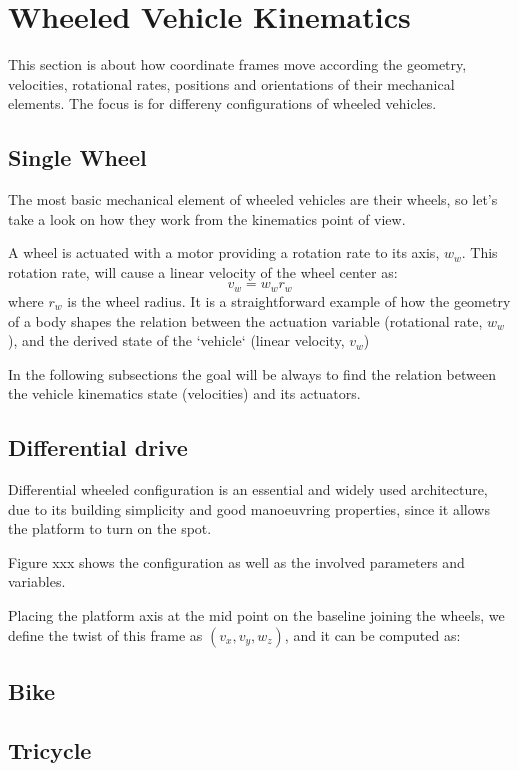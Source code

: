 \section{Wheeled Vehicle Kinematics}
This section is about how coordinate frames move according the geometry, velocities, rotational rates, positions and orientations of their mechanical elements. The focus is for differeny configurations of wheeled vehicles. 

\subsection{Single Wheel}
The most basic mechanical element of wheeled vehicles are their wheels, so let's take a look on how they work from the kinematics point of view.

A wheel is actuated with a motor providing a rotation rate to its axis, $w_w$. This rotation rate, will cause a linear velocity of the wheel center as: 
\begin{equation}
 v_w = w_w r_w
\end{equation}
where $r_w$ is the wheel radius. It is a straightforward example of how the geometry of a body shapes the relation between the actuation variable (rotational rate, $w_w$), and the derived state of the `vehicle` (linear velocity, $v_w$)

In the following subsections the goal will be always to find the relation between the vehicle kinematics state (velocities) and its actuators. 

\subsection{Differential drive}
Differential wheeled configuration is an essential and widely used architecture, due to its building simplicity and good manoeuvring properties, since it allows the platform to turn on the spot. 

Figure xxx shows the configuration as well as the involved parameters and variables. 

Placing the platform axis at the mid point on the baseline joining the wheels, we define the twist of this frame as $(v_x, v_y, w_z)$, and it can be computed as: 


\subsection{Bike}

\subsection{Tricycle}

